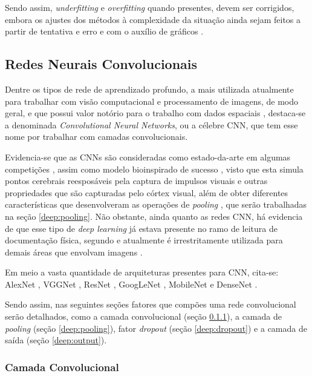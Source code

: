 Sendo assim, \textit{underfitting} e \textit{overfitting} quando presentes, devem ser corrigidos, embora os ajustes dos métodos à complexidade da situação ainda sejam feitos a partir de tentativa e erro e com o auxílio de gráficos \cite{Goodfellow2016}.


\subsection{Redes Neurais Convolucionais}
\label{deep:CNN}

Dentre os tipos de rede de aprendizado profundo, a mais utilizada atualmente para trabalhar com visão computacional e processamento de imagens, de modo geral, e que possui valor notório para o trabalho com dados espaciais \cite{Goodfellow2016, ponti2018funciona, Ghosh2019}, destaca-se a denominada \textit{Convolutional Neural Networks}\cite{LeCun1999ObjectLearning}, ou a célebre CNN, que tem esse nome por trabalhar com camadas convolucionais.

Evidencia-se que as CNNs são consideradas como estado-da-arte em algumas competições \cite{Parkhi2015}, assim como modelo bioinspirado de sucesso \cite{Goodfellow2016}, visto que esta simula pontos cerebrais reesposáveis pela captura de impulsos visuais e outras propriedades que são capturadas pelo córtex visual, além de obter diferentes características que desenvolveram as operações de \textit{pooling} \cite{Goodfellow2016}, que serão trabalhadas na seção \ref{deep:pooling}. Não obstante, ainda quanto as redes CNN, há evidencia de que esse tipo de \textit{deep learning} já estava presente no ramo de leitura de documentação física, segundo \cite{Goodfellow2016} e atualmente é irrestritamente utilizada para demais áreas que envolvam imagens \cite{Ghosh2019}.

Em meio a vasta quantidade de arquiteturas presentes para CNN, cita-se: AlexNet \cite{krizhevsky2012imagenet}, VGGNet \cite{Simonyan2015VeryRecognition}, ResNet \cite{He2016}, GoogLeNet \cite{Szegedy2015GoingConvolutions}, MobileNet \cite{Howard2017MobileNets:Applications} e DenseNet \cite{Huang2017DenselyNetworks}.

Sendo assim, nas seguintes seções fatores que compões uma rede convolucional serão detalhados, como a camada convolucional (seção \ref{deep:conv}), a camada de \textit{pooling} (seção \ref{deep:pooling}), fator \textit{dropout} (seção \ref{deep:dropout}) e a camada de saída (seção \ref{deep:output}).


\subsubsection{Camada Convolucional}
\label{deep:conv}

